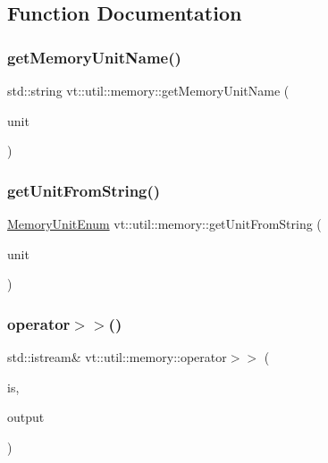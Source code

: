 \subsection{Function Documentation}
\mbox{\label{namespacevt_1_1util_1_1memory_a6a1de4e8806e74e6e0ef92e4262b654b}} 
\subsubsection{\texorpdfstring{get\+Memory\+Unit\+Name()}{getMemoryUnitName()}}
{\footnotesize\ttfamily std\+::string vt\+::util\+::memory\+::get\+Memory\+Unit\+Name (\begin{DoxyParamCaption}\item[{\hyperlink{namespacevt_1_1util_1_1memory_a64df3d84293b34009f78e2a1db2f9bb6}{Memory\+Unit\+Enum}}]{unit }\end{DoxyParamCaption})}

\mbox{\label{namespacevt_1_1util_1_1memory_aeceb7d7ac924dd3d88a58eab5ebf64f7}} 
\subsubsection{\texorpdfstring{get\+Unit\+From\+String()}{getUnitFromString()}}
{\footnotesize\ttfamily \hyperlink{namespacevt_1_1util_1_1memory_a64df3d84293b34009f78e2a1db2f9bb6}{Memory\+Unit\+Enum} vt\+::util\+::memory\+::get\+Unit\+From\+String (\begin{DoxyParamCaption}\item[{std\+::string const \&}]{unit }\end{DoxyParamCaption})}

\mbox{\label{namespacevt_1_1util_1_1memory_afe1acbbca9aa1bd7310548cefd40045c}} 
\subsubsection{\texorpdfstring{operator$>$$>$()}{operator>>()}}
{\footnotesize\ttfamily std\+::istream\& vt\+::util\+::memory\+::operator$>$$>$ (\begin{DoxyParamCaption}\item[{std\+::istream \&}]{is,  }\item[{\hyperlink{structvt_1_1util_1_1memory_1_1_comma_delimit}{Comma\+Delimit} \&}]{output }\end{DoxyParamCaption})}



